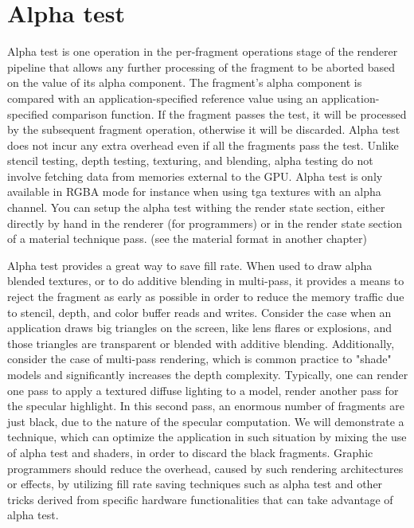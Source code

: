 \section{Alpha test}
Alpha test is one operation in the per-fragment operations stage of the renderer pipeline that
allows any further processing of the fragment to be aborted based on the value of its alpha component. The
fragment's alpha component is compared with an application-specified reference value
using an application-specified comparison function. If the fragment passes the test, it will
be processed by the subsequent fragment operation, otherwise it will be discarded. Alpha
test does not incur any extra overhead even if all the fragments pass the test. Unlike
stencil testing, depth testing, texturing, and blending, alpha testing do not involve
fetching data from memories external to the GPU. Alpha test is only available in RGBA
mode for instance when using tga textures with an alpha channel. You can setup the alpha
test withing the render state section, either directly by hand in the renderer (for programmers)
or in the render state section of a material technique pass. (see the material format in another chapter)

Alpha test provides a great way to save fill rate. When used to draw alpha blended
textures, or to do additive blending in multi-pass, it provides a means to reject the
fragment as early as possible in order to reduce the memory traffic due to stencil, depth,
and color buffer reads and writes.
Consider the case when an application draws big triangles on the screen, like lens
flares or explosions, and those triangles are transparent or blended with additive blending.
Additionally, consider the case of multi-pass rendering, which is common practice to
"shade" models and significantly increases the depth complexity. Typically, one can
render one pass to apply a textured diffuse lighting to a model, render another pass for the
specular highlight. In this second pass, an enormous number of fragments are just black,
due to the nature of the specular computation. We will demonstrate a technique, which
can optimize the application in such situation by mixing the use of alpha test and shaders,
in order to discard the black fragments.
Graphic programmers should reduce the overhead, caused by such rendering
architectures or effects, by utilizing fill rate saving techniques such as alpha test and
other tricks derived from specific hardware functionalities that can take advantage of
alpha test.

